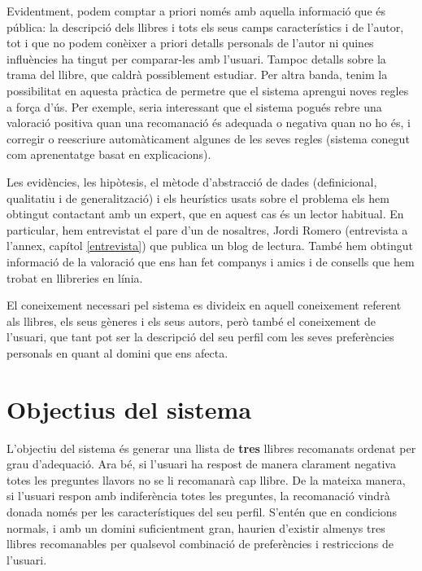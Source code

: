 Evidentment, podem comptar a priori només amb aquella informació que és pública: la descripció dels llibres i tots els seus camps característics i de l'autor, tot i que no podem conèixer a priori detalls personals de l'autor ni quines influències ha tingut per comparar-les amb l'usuari. Tampoc detalls sobre la trama del llibre, que caldrà possiblement estudiar. Per altra banda, tenim la possibilitat en aquesta pràctica de permetre que el sistema aprengui noves regles a força d'ús. Per exemple, seria interessant que el sistema pogués rebre una valoració positiva quan una recomanació és adequada o negativa quan no ho és, i corregir o reescriure automàticament algunes de les seves regles (sistema conegut com aprenentatge basat en explicacions).

Les evidències, les hipòtesis, el mètode d'abstracció de dades (definicional, qualitatiu i de generalització) i els heurístics usats sobre el problema els hem obtingut contactant amb un expert, que en aquest cas és un lector habitual. En particular, hem entrevistat el pare d'un de nosaltres, Jordi Romero (entrevista a l'annex, capítol \ref{entrevista}) que publica un blog de lectura. També hem obtingut informació de la valoració que ens han fet companys i amics i de consells que hem trobat en llibreries en línia.

El coneixement necessari pel sistema es divideix en aquell coneixement referent als llibres, els seus gèneres i els seus autors, però també el coneixement de l'usuari, que tant pot ser la descripció del seu perfil com les seves preferències personals en quant al domini que ens afecta.


\section{Objectius del sistema}

L'objectiu del sistema és generar una llista de \textbf{tres} llibres recomanats ordenat per grau d'adequació. Ara bé, si l'usuari ha respost de manera clarament negativa totes les preguntes llavors no se li recomanarà cap llibre. De la mateixa manera, si l'usuari respon amb indiferència totes les preguntes, la recomanació vindrà donada només per les característiques del seu perfil. S'entén que en condicions normals, i amb un domini suficientment gran, haurien d'existir almenys tres llibres recomanables per qualsevol combinació de preferències i restriccions de l'usuari.





